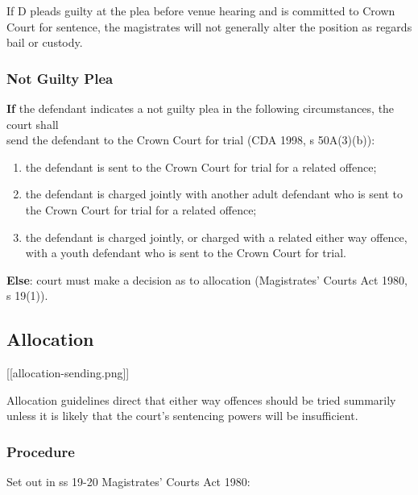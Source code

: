 \documentclass[
]{article}
\providecommand{\tightlist}{%
  \setlength{\itemsep}{0pt}\setlength{\parskip}{0pt}}
\begin{document}
If D pleads guilty at the plea before venue hearing and is committed to
Crown Court for sentence, the magistrates will not generally alter the
position as regards bail or custody.

\hypertarget{not-guilty-plea}{%
\subsubsection{Not Guilty Plea}\label{not-guilty-plea}}

\textbf{If} the defendant indicates a not guilty plea in the following
circumstances, the court shall\\
send the defendant to the Crown Court for trial (CDA 1998, s 50A(3)(b)):

\begin{enumerate}
\def\labelenumi{\arabic{enumi}.}
\tightlist
\item
  the defendant is sent to the Crown Court for trial for a related
  offence;
\item
  the defendant is charged jointly with another adult defendant who is
  sent to the Crown Court for trial for a related offence;
\item
  the defendant is charged jointly, or charged with a related either way
  offence, with a youth defendant who is sent to the Crown Court for
  trial.
\end{enumerate}

\textbf{Else}: court must make a decision as to allocation (Magistrates'
Courts Act 1980, s 19(1)).

\hypertarget{allocation}{%
\subsection{Allocation}\label{allocation}}

{[}{[}allocation-sending.png{]}{]}

Allocation guidelines direct that either way offences should be tried
summarily unless it is likely that the court's sentencing powers will be
insufficient.

\hypertarget{procedure-1}{%
\subsubsection{Procedure}\label{procedure-1}}

Set out in ss 19-20 Magistrates' Courts Act 1980:
\end{document}
